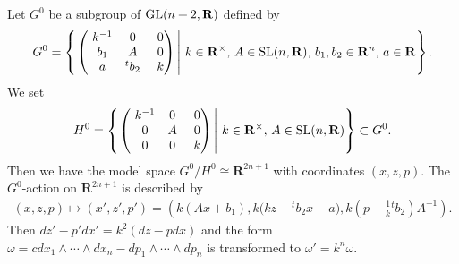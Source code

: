 \documentclass[pdftex]{sigma}
\begin{document}
Let $G^0$ be a subgroup of ${\rm GL}(n+2, {\mathbf{R}})$ def\/ined by
\begin{gather*}
G^0 = \left\{ \left.
\begin{pmatrix}
                      \ k^{-1} & 0 & \ 0 \\
                      \ b_1 & A & \ 0 \\
                      \ a & {}^tb_2 &  \ k
                    \end{pmatrix}
                   \,  \right\vert \,
                    k \in {\mathbf{R}}^{\times}, \, A \in  {\rm SL}(n, {\mathbf{R}}), \, b_1, b_2 \in {\mathbf{R}}^n, \, a \in {\mathbf{R}}
                    \right\}.
\end{gather*}
We set
\begin{gather*}
H^0 = \left\{ \left.
\begin{pmatrix}
                      \ k^{-1} & 0 & \ 0 \\
                      \ 0 & A & \ 0 \\
                      \ 0 & 0 &  \ k
                              \end{pmatrix}
         \,  \right\vert   \,
        k \in {\mathbf{R}}^{\times}, \, A \in  {\rm SL} (n, {\mathbf{R}})
 \right\}
\subset G^0.
\end{gather*}
Then we have the model space
$G^0/H^0 \cong {\mathbf{R}}^{2n+1}$ with coordinates
$(x, z, p)$.
The $G^0$-action on ${\mathbf{R}}^{2n+1}$ is described by
\begin{gather*}
(x, z, p) \mapsto (x', z', p') = \left(k(Ax + b_1), k\big(kz - {}^tb_2x - a\big), k\left(p - \frac{1}{k}{}^tb_2\right)A^{-1}\right).
\end{gather*}
Then $dz' - p'dx' = k^2(dz - pdx)$ and
the form $\omega = c dx_1\wedge \cdots\wedge dx_n - dp_1\wedge\cdots\wedge dp_n$
is transformed to $\omega' = k^n\omega$.
\end{document}
